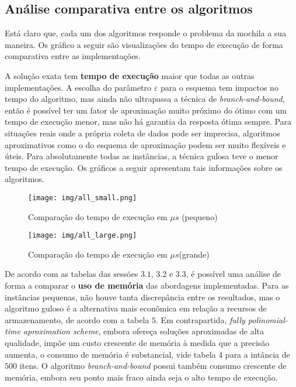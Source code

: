 \documentclass[12pt]{article}
\begin{document}
\subsection{Análise comparativa entre os algoritmos}

Está claro que, cada um dos algoritmos responde o problema da mochila a sua maneira. Os gráfico a seguir são visualizações do tempo de execução de forma comparativa entre as implementações.

A solução exata tem \textbf{tempo de execução} maior que todas as outras implementações. A escolha do parâmetro \(\varepsilon\) para o esquema tem impactos no tempo do algoritmo, mas ainda não ultrapassa a técnica de \textit{branch-and-bound}, então é possível ter um fator de aproximação muito próximo do ótimo com um tempo de execução menor, mas não há garantia da resposta ótima sempre. Para situações reais onde a própria coleta de dados pode ser imprecisa, algoritmos aproximativos como o do esquema de aproximação podem ser muito flexíveis e úteis. Para absolutamente todas as instâncias, a técnica gulosa teve o menor tempo de execução.
Os gráficos a seguir apresentam tais informações sobre os algoritmos. 

\begin{figure}[H]
    \centering
    \begin{minipage}[b]{0.48\linewidth}
        \centering
        \texttt{[image: img/all\_small.png]}
        \caption{Comparação do tempo de execução em \(\mu s\) (pequeno)}
        \label{fig:fptas_small}
    \end{minipage}
    \hfill
    \begin{minipage}[b]{0.48\linewidth}
        \centering
        \texttt{[image: img/all\_large.png]}
        \caption{Comparação do tempo de execução em \(\mu s\)(grande)}
        \label{fig:fptas_large}
    \end{minipage}
\end{figure}

De acordo com as tabelas das sessões \(3.1\), \(3.2\) e \(3.3\), é possível uma análise de forma a comparar o \textbf{uso de memória} das abordagens implementadas. Para as instâncias pequenas, não houve tanta discrepância entre os resultados, mas o algoritmo guloso é a alternativa mais econômica em relação a recursos de armazenamento, de acordo com a tabela \(5\). Em contrapartida, \textit{fully polinomial-time aproximation scheme}, embora ofereça soluções aproximadas de alta qualidade, impõe um custo crescente de memória à medida que a precisão aumenta, o consumo de memória é substancial, vide tabela \(4\) para a intância de \(500\) itens. O algoritmo \textit{branch-and-bound} possui também consumo crescente de memória, embora seu ponto mais fraco ainda seja o alto tempo de execução.
\end{document}
